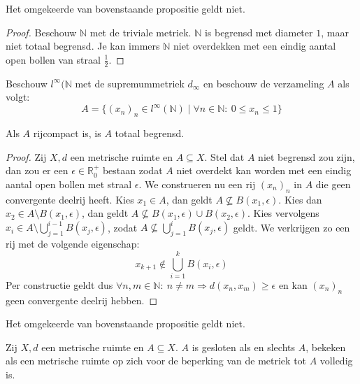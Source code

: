\documentclass[main.tex]{subfiles}
\begin{document}
\begin{tvb}
  Het omgekeerde van bovenstaande propositie geldt niet.

  \begin{proof}
    Beschouw $\mathbb{N}$ met de triviale metriek.
    $\mathbb{N}$ is begrensd met diameter $1$, maar niet totaal begrensd.
    Je kan immers $\mathbb{N}$ niet overdekken met een eindig aantal open bollen van straal $\frac{1}{2}$.
  \end{proof}
\end{tvb}

\begin{tvb}
  Beschouw $l^{\infty}(\mathbb{N}$ met de supremummetriek $d_{\infty}$ en beschouw de verzameling $A$ als volgt:
  \[ A = \{ (x_{n})_{n} \in l^{\infty}(\mathbb{N}) \mid \forall n\in \mathbb{N}:\ 0 \le x_{n} \le 1 \} \]
\end{tvb}

\begin{bpr}
  \label{pr:rijcompact-dan-totaal-begrensd}
  Als $A$ rijcompact is, is $A$ totaal begrensd.

  \begin{proof}
    Zij $X,d$ een metrische ruimte en $A \subseteq X$.
    Stel dat $A$ niet begrensd zou zijn, dan zou er een $\epsilon \in \mathbb{R}_{0}^{+}$ bestaan zodat $A$ niet overdekt kan worden met een eindig aantal open bollen met straal $\epsilon$.
    We construeren nu een rij $(x_{n})_{n}$ in $A$ die geen convergente deelrij heeft.
    Kies $x_{1}\in A$, dan geldt $A \not\subseteq B(x_{1},\epsilon)$.
    Kies dan $x_{2}\in A \setminus B(x_{1},\epsilon)$, dan geldt $A \not \subseteq B(x_{1},\epsilon) \cup B(x_{2},\epsilon)$.
    Kies vervolgens $x_{i}\in A\setminus \bigcup_{j=1}^{i-1}B(x_{j},\epsilon)$, zodat $A \not \subseteq \bigcup_{j=1}^{i}B(x_{j},\epsilon)$ geldt.
    We verkrijgen zo een rij met de volgende eigenschap:
    \[ x_{k+1} \not \in \bigcup_{i=1}^{k}B(x_{i},\epsilon) \]
    Per constructie geldt dus $\forall n,m\in \mathbb{N}:\ n\neq m \Rightarrow d(x_{n},x_{m}) \ge \epsilon$ en kan $(x_{n})_{n}$ geen convergente deelrij hebben.
  \end{proof}
\end{bpr}

\begin{tvb}
  Het omgekeerde van bovenstaande propositie geldt niet.
\end{tvb}

\begin{st}
  Zij $X,d$ een metrische ruimte en $A \subseteq X$.
  $A$ is gesloten als en slechts $A$, bekeken als een metrische ruimte op zich voor de beperking van de metriek tot $A$ volledig is.
\end{st}
\end{document}
